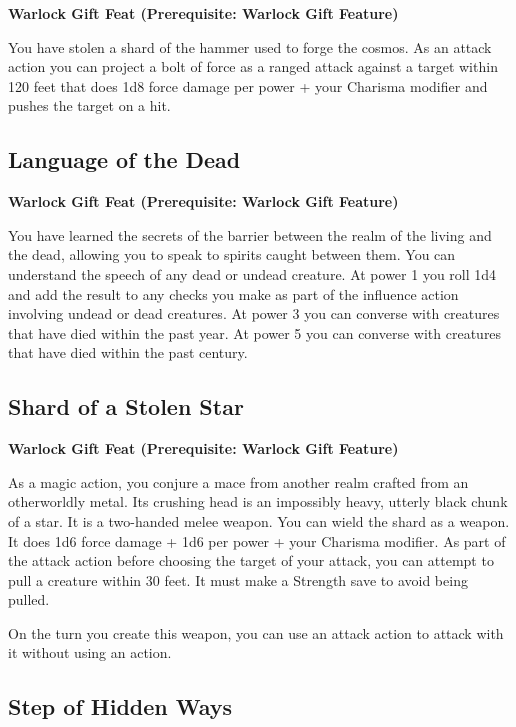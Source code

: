 \documentclass[12pt,letterpaper,twocolumn,openany,nodeprecatedcode,bg=none]{dndbook}
\begin{document}
\textbf{Warlock Gift Feat (Prerequisite: Warlock Gift Feature)}

You have stolen a shard of the hammer used to forge the cosmos. As an
attack action you can project a bolt of force as a ranged attack against
a target within 120 feet that does 1d8 force damage per power + your
Charisma modifier and pushes the target on a hit.

\subsection{Language of the Dead}\label{language-of-the-dead}

\textbf{Warlock Gift Feat (Prerequisite: Warlock Gift Feature)}

You have learned the secrets of the barrier between the realm of the
living and the dead, allowing you to speak to spirits caught between
them. You can understand the speech of any dead or undead creature. At
power 1 you roll 1d4 and add the result to any checks you make as part
of the influence action involving undead or dead creatures. At power 3
you can converse with creatures that have died within the past year. At
power 5 you can converse with creatures that have died within the past
century.

\subsection{Shard of a Stolen Star}\label{shard-of-a-stolen-star}

\textbf{Warlock Gift Feat (Prerequisite: Warlock Gift Feature)}

As a magic action, you conjure a mace from another realm crafted from an
otherworldly metal. Its crushing head is an impossibly heavy, utterly
black chunk of a star. It is a two-handed melee weapon. You can wield
the shard as a weapon. It does 1d6 force damage + 1d6 per power + your
Charisma modifier. As part of the attack action before choosing the
target of your attack, you can attempt to pull a creature within 30
feet. It must make a Strength save to avoid being pulled.

On the turn you create this weapon, you can use an attack action to
attack with it without using an action.

\subsection{Step of Hidden Ways}\label{step-of-hidden-ways}
\end{document}
